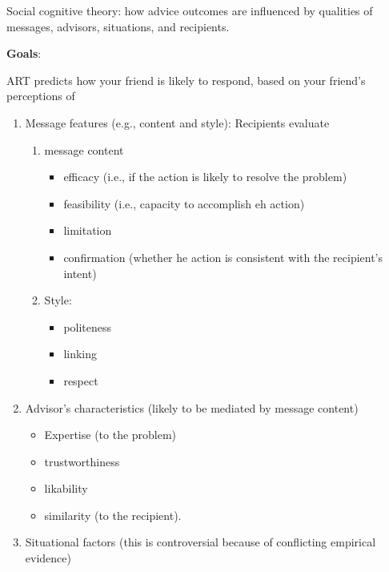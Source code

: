 \documentclass[
]{book}
\providecommand{\tightlist}{%
  \setlength{\itemsep}{0pt}\setlength{\parskip}{0pt}}
\begin{document}
Social cognitive theory: how advice outcomes are influenced by qualities of messages, advisors, situations, and recipients.

\textbf{Goals}:

ART predicts how your friend is likely to respond, based on your friend's perceptions of

\begin{enumerate}
\def\labelenumi{\arabic{enumi}.}
\item
  Message features (e.g., content and style): Recipients evaluate

  \begin{enumerate}
  \def\labelenumii{\arabic{enumii}.}
  \item
    message content

    \begin{itemize}
    \tightlist
    \item
      efficacy (i.e., if the action is likely to resolve the problem)
    \item
      feasibility (i.e., capacity to accomplish eh action)
    \item
      limitation
    \item
      confirmation (whether he action is consistent with the recipient's intent)
    \end{itemize}
  \item
    Style:

    \begin{itemize}
    \tightlist
    \item
      politeness
    \item
      linking
    \item
      respect
    \end{itemize}
  \end{enumerate}
\item
  Advisor's characteristics (likely to be mediated by message content)

  \begin{itemize}
  \tightlist
  \item
    Expertise (to the problem)
  \item
    trustworthiness
  \item
    likability
  \item
    similarity (to the recipient).
  \end{itemize}
\item
  Situational factors (this is controversial because of conflicting empirical evidence)


\end{enumerate}
\end{document}
